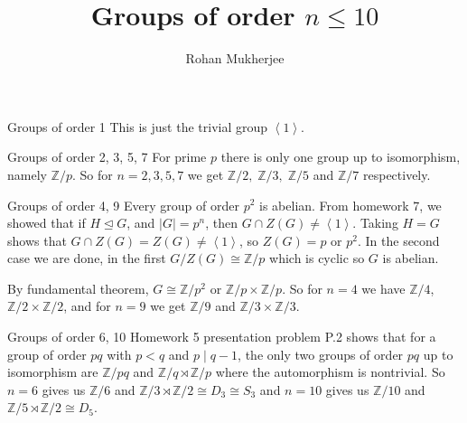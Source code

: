 \documentclass{beamer}
\title{Groups of order $n \leq 10$}
\author{Rohan Mukherjee}
\def\mbb#1{\mathbb{#1}}
\newcommand{\Z}{\mbb Z}
\newcommand{\gen}[1]{\left\langle #1 \right\rangle}
\newcommand{\nsg}{\trianglelefteq}
\begin{document}
\begin{frame}[plain]
    \maketitle
\end{frame}

\begin{frame}{Groups of order 1}
	This is just the trivial group $\gen{1}$.
\end{frame}
\begin{frame}{Groups of order 2, 3, 5, 7}
	For prime $p$ there is only one group up to isomorphism, namely $\Z/p$. So for $n = 2, 3, 5, 7$ we get $\Z/2,\; \Z/3,\; \Z/5$ and $\Z/7$ respectively.
\end{frame}
\begin{frame}{Groups of order 4, 9}
	Every group of order $p^2$ is abelian. From homework 7, we showed that if $H \nsg G$, and $|G| = p^n$, then $G \cap Z(G) \neq \gen{1}$. Taking $H = G$ shows that $G \cap Z(G) = Z(G) \neq \gen{1}$, so $Z(G) = p$ or $p^2$. In the second case we are done, in the first $G/Z(G) \cong \Z/p$ which is cyclic so $G$ is abelian.
	
	By fundamental theorem, $G \cong \Z/p^2$ or $\Z/p \times \Z/p$. So for $n=4$ we have $\Z/4$, $\Z/2 \times \Z/2$, and for $n = 9$ we get $\Z/9$ and $\Z/3 \times \Z/3$.
\end{frame}
\begin{frame}{Groups of order 6, 10}
	Homework 5 presentation problem P.2 shows that for a group of order $pq$ with $p < q$ and $p \mid q-1$, the only two groups of order $pq$ up to isomorphism are $\Z/pq$ and $\Z/q \rtimes \Z/p$ where the automorphism is nontrivial. So $n=6$ gives us $\Z/6$ and $\Z/3 \rtimes \Z/2 \cong D_3 \cong S_3$ and $n=10$ gives us $\Z/10$ and $\Z/5 \rtimes \Z/2 \cong D_5$.
\end{frame}
\end{document}
